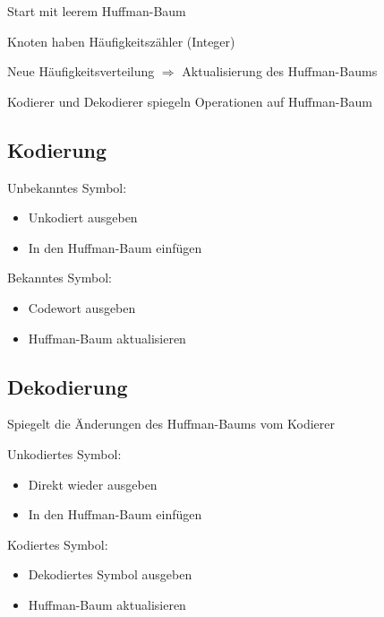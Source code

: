 \documentclass[xcolor=dvipsnames,presentation]{beamer}    %
\newenvironment{witemize}{\itemize\setlength{\itemsep}{1em}}{\enditemize}
\begin{document}
\begin{frame}{\insertsection}
  \begin{witemize}
  \item Start mit leerem Huffman-Baum
  \item Knoten haben Häufigkeitszähler (Integer)
  \item Neue Häufigkeitsverteilung $\Rightarrow$ Aktualisierung des
    Huffman-Baums
  \item Kodierer und Dekodierer spiegeln Operationen auf Huffman-Baum
  \end{witemize}
\end{frame}

\subsection{Kodierung}

\begin{frame}{\insertsubsection}
  \begin{witemize}
  \item Unbekanntes Symbol:
    \begin{itemize}
    \item Unkodiert ausgeben
    \item In den Huffman-Baum einfügen
    \end{itemize}

  \item Bekanntes Symbol:
    \begin{itemize}
    \item Codewort ausgeben
    \item Huffman-Baum aktualisieren
    \end{itemize}
  \end{witemize}
\end{frame}

\subsection{Dekodierung}

\begin{frame}{\insertsubsection}
  \begin{witemize}
  \item Spiegelt die Änderungen des Huffman-Baums vom Kodierer
  \item Unkodiertes Symbol:
    \begin{itemize}
      \item Direkt wieder ausgeben
      \item In den Huffman-Baum einfügen
    \end{itemize}
  \item Kodiertes Symbol:
    \begin{itemize}
    \item Dekodiertes Symbol ausgeben
    \item Huffman-Baum aktualisieren
    \end{itemize}
  \end{witemize}
\end{frame}
\end{document}
